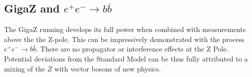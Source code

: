 \subsection{GigaZ and $e^+e^- \rightarrow b\bar{b}$}
The GigaZ running develops its full power when combined with measurements above the the Z-pole. This can be impressively demonstrated with the process $e^+e^- \rightarrow b\bar{b}$. There are no propagator or interference effects at the Z Pole. Potential deviations from the Standard Model can be thus fully attributed to a mixing of the $Z$ with vector bosons of new physics.   

